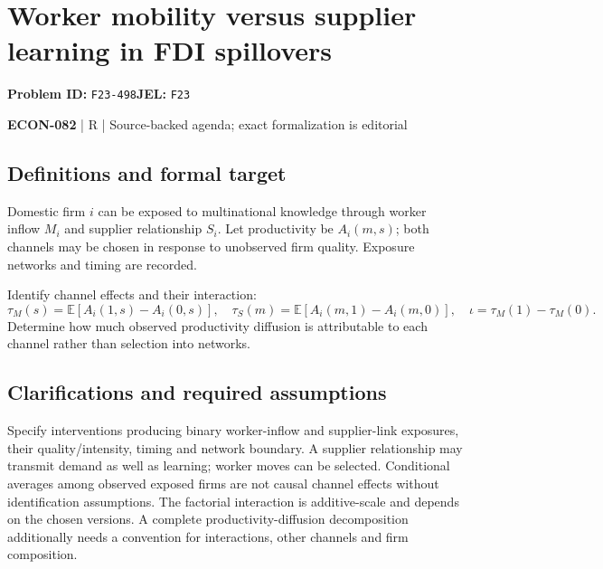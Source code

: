 \documentclass[11pt,a4paper]{article}
\begin{document}
\section*{Worker mobility versus supplier learning in FDI spillovers}
\textbf{Problem ID:} \texttt{F23-498}\quad \textbf{JEL:} \texttt{F23}\par
\label{problem:OP-0645}


\label{audited:ECON-082}

{\sffamily\small\color{muted}\textbf{ECON-082} | R | Source-backed agenda; exact formalization is editorial\par}

\subsection*{Definitions and formal target}

Domestic firm $i$ can be exposed to multinational knowledge through worker inflow $M_i$ and supplier relationship $S_i$. Let productivity be $A_i(m,s)$; both channels may be chosen in response to unobserved firm quality. Exposure networks and timing are recorded.

Identify channel effects and their interaction:
\[
 \tau_M(s)=\mathbb E[A_i(1,s)-A_i(0,s)],\quad
 \tau_S(m)=\mathbb E[A_i(m,1)-A_i(m,0)],\quad
 \iota=\tau_M(1)-\tau_M(0).
\]
Determine how much observed productivity diffusion is attributable to each channel rather than selection into networks.

\subsection*{Clarifications and required assumptions}

Specify interventions producing binary worker-inflow and supplier-link exposures, their quality/intensity, timing and network boundary. A supplier relationship may transmit demand as well as learning; worker moves can be selected. Conditional averages among observed exposed firms are not causal channel effects without identification assumptions. The factorial interaction is additive-scale and depends on the chosen versions. A complete productivity-diffusion decomposition additionally needs a convention for interactions, other channels and firm composition.
\end{document}
